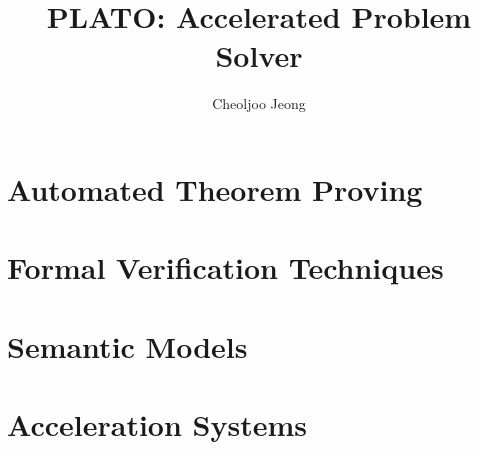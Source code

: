 \documentclass{pamsbook}
\theoremstyle{definition}
\begin{document}
\title{\LARGE\bf PLATO: Accelerated Problem Solver}
\author{\large Cheoljoo Jeong}
\maketitle
\tableofcontents

\part{Automated Theorem Proving}

\part{Formal Verification Techniques}

\part{Semantic Models}
 
\part{Acceleration Systems}

%


\nocite{Barwise77,Birkhoff67,Brown03,CK90,DP02,Moschovakis94,WN93}
\end{document}
